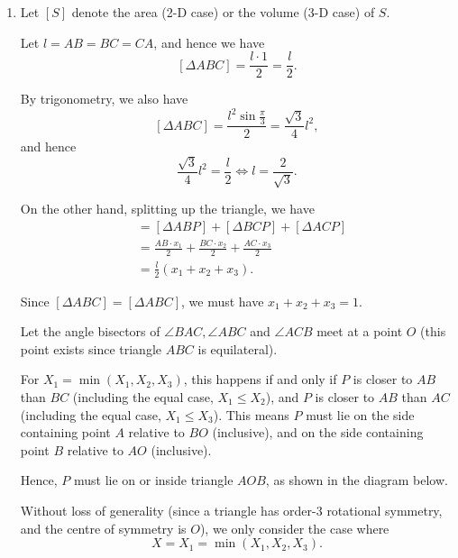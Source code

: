 \Question{\currfilebase}

\begin{enumerate}
    \item Let \([S]\) denote the area (2-D case) or the volume (3-D case) of \(S\).

          Let \(l = AB = BC = CA\), and hence we have
          \[
              [\Delta ABC] = \frac{l \cdot 1}{2} = \frac{l}{2}.
          \]

          By trigonometry, we also have
          \[
              [\Delta ABC] = \frac{l^2 \sin \frac{\pi}{3}}{2} = \frac{\sqrt{3}}{4} l^2,
          \]
          and hence
          \[
              \frac{\sqrt{3}}{4} l^2 = \frac{l}{2} \iff l = \frac{2}{\sqrt{3}}.
          \]

          On the other hand, splitting up the triangle, we have
          \begin{align*}
              [\Delta ABC] & = [\Delta ABP] + [\Delta BCP] + [\Delta ACP]                               \\
                           & = \frac{AB \cdot x_1}{2} + \frac{BC \cdot x_2}{2} + \frac{AC \cdot x_3}{2} \\
                           & = \frac{l}{2} \left(x_1 + x_2 + x_3\right).
          \end{align*}

          Since \([\Delta ABC] = [\Delta ABC]\), we must have \(x_1 + x_2 + x_3 = 1\).

          Let the angle bisectors of \(\angle BAC, \angle ABC\) and \(\angle ACB\) meet at a point \(O\) (this point exists since triangle \(ABC\) is equilateral).

          For \(X_1 = \min(X_1, X_2, X_3)\), this happens if and only if \(P\) is closer to \(AB\) than \(BC\) (including the equal case, \(X_1 \leq X_2\)), and \(P\) is closer to \(AB\) than \(AC\) (including the equal case, \(X_1 \leq X_3\)). This means \(P\) must lie on the side containing point \(A\) relative to \(BO\) (inclusive), and on the side containing point \(B\) relative to \(AO\) (inclusive).

          Hence, \(P\) must lie on or inside triangle \(AOB\), as shown in the diagram below.

          Without loss of generality (since a triangle has order-\(3\) rotational symmetry, and the centre of symmetry is \(O\)), we only consider the case where
          \[
              X = X_1 = \min(X_1, X_2, X_3).
          \]


\end{enumerate}
